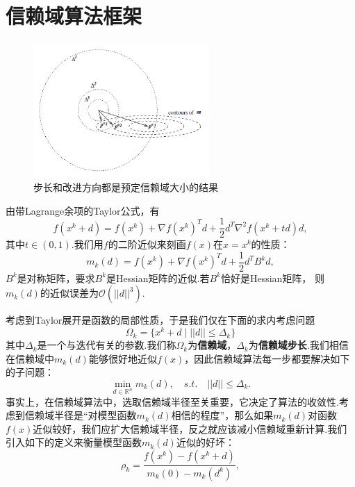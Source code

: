 \section{信赖域算法框架}
\begin{figure}[h!]
\caption{步长和改进方向都是预定信赖域大小的结果}
\centering
\includegraphics[width=0.6\textwidth]{img/TRM_stepsize.png}
\end{figure}
由带Lagrange余项的Taylor公式，有
\begin{equation*}
	f(x^k+d) = f(x^k) + \nabla f(x^k)^T d +\frac{1}{2}d^T\nabla^2 f(x^k+td)d,
\end{equation*}
其中$t\in (0, 1)$.我们用$f$的二阶近似来刻画$f(x)$在$x=x^k$的性质：
\begin{equation}\label{model_function}
	m_k(d) = f(x^k) +\nabla f(x^k)^Td + \frac{1}{2}d^TB^kd,
\end{equation}
$B^k$是对称矩阵，要求$B^k$是Hessian矩阵的近似.若$B^k$恰好是Hessian矩阵， 则$m_k(d)$的近似误差为$\mathcal{O}(||d||^3)$.\par
考虑到Taylor展开是函数的局部性质，于是我们仅在下面的求内考虑问题
\begin{equation*}
	\Omega_k = \{x^k + d\mid ||d||\leq \Delta_k\}
\end{equation*}
其中$\Delta_k$是一个与迭代有关的参数.我们称$\Omega_k$为\textbf{信赖域}，$\Delta_k$为\textbf{信赖域步长}.我们相信在信赖域中$m_k(d)$能够很好地近似$f(x)$，因此信赖域算法每一步都要解决如下的子问题：
\begin{equation}\label{subp}
	\min\limits_{d\in \mathbb{R}^n} m_k(d),\quad s.t.\quad ||d||\leq \Delta_k.
\end{equation}
事实上，在信赖域算法中，选取信赖域半径至关重要，它决定了算法的收敛性.考虑到信赖域半径是“对模型函数$m_k(d)$相信的程度”，那么如果$m_k(d)$对函数$f(x)$近似较好，我们应扩大信赖域半径，反之就应该减小信赖域重新计算.我们引入如下的定义来衡量模型函数$m_k(d)$近似的好坏：
\begin{equation}\label{rho}
	\rho_k = \frac{f(x^k)-f(x^k+d)}{m_k(0)-m_k(d^k)},
\end{equation}
